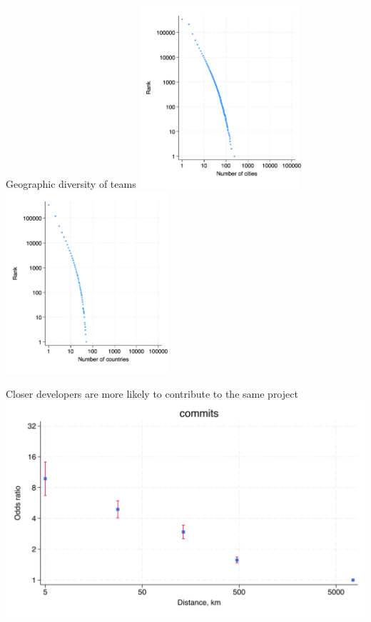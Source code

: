 \documentclass[
  ignorenonframetext,
  aspectratio=169,
]{beamer}
\begin{document}
\begin{frame}{Geographic diversity of teams}
\protect\hypertarget{geographic-diversity-of-teams}{}
\includegraphics[width=0.45\textwidth,height=\textheight]{figures/cities_rank.png}
\includegraphics[width=0.45\textwidth,height=\textheight]{figures/countries_rank.png}
\end{frame}

\begin{frame}{Closer developers are more likely to contribute to the
same project}
\protect\hypertarget{closer-developers-are-more-likely-to-contribute-to-the-same-project}{}
\includegraphics{figures/commits_gravity.png}
\end{frame}
\end{document}
